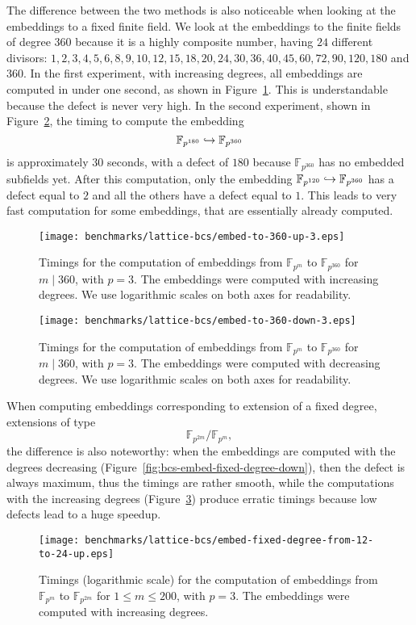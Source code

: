 The difference between the two methods is also noticeable when looking at the
embeddings to a fixed finite field. We look at the embeddings to the finite
fields of degree $360$ because it is a highly composite number, having $24$
different divisors: $1, 2, 3, 4, 5, 6, 8, 9, 10, 12, 15, 18, 20, 24, 30, 36, 40,
45, 60, 72, 90, 120, 180$ and $360$. In the first experiment, with increasing
degrees, all embeddings are computed in under one second, as shown in
Figure~\ref{fig:bcs-embed-to-360-up}. This is understandable because the defect is
never very high. In the second experiment, shown in
Figure~\ref{fig:bcs-embed-to-360-down}, the timing to compute the embedding 
\[
  \mathbb{F}_{p^{180}}\hookrightarrow\mathbb{F}_{p^{360}}
\]
is approximately $30$ seconds, with a defect of $180$ because
$\mathbb{F}_{p^{360}}$ has no embedded subfields yet. After this computation,
only the embedding $\mathbb{F}_{p^{120}}\hookrightarrow\mathbb{F}_{p^{360}}$ has a defect
equal to $2$ and all the others have a defect equal to $1$. This leads to very
fast computation for some embeddings, that are essentially already computed.
\begin{figure}
  \centering
  \texttt{[image: benchmarks/lattice-bcs/embed-to-360-up-3.eps]}
  \caption{Timings for the computation of embeddings from $\mathbb{F}_{p^{m}}$
  to $\mathbb{F}_{p^{360}}$ for $m\mid 360$, with $p=3$. The
  embeddings were computed with increasing degrees. We use logarithmic scales on
  both axes for readability.}
  \label{fig:bcs-embed-to-360-up}
\end{figure}
\begin{figure}
  \centering
  \texttt{[image: benchmarks/lattice-bcs/embed-to-360-down-3.eps]}
  \caption{Timings for the computation of embeddings from $\mathbb{F}_{p^{m}}$
  to $\mathbb{F}_{p^{360}}$ for $m\mid 360$, with $p=3$. The
  embeddings were computed with decreasing degrees. We use logarithmic scales on
  both axes for readability.}
  \label{fig:bcs-embed-to-360-down}
\end{figure}
When computing embeddings corresponding to extension of a fixed degree, \eg
extensions of type
\[
  \mathbb{F}_{p^{2m}}/\mathbb{F}_{p^{m}},
\]
the difference is also noteworthy: when the embeddings are computed with the
degrees decreasing (Figure~\ref{fig:bcs-embed-fixed-degree-down}), then the defect is
always maximum, thus the timings are rather smooth, while the computations with
the increasing degrees (Figure~\ref{fig:bcs-embed-fixed-degree-up}) produce
erratic timings because low defects lead to a huge speedup.
\begin{figure}
  \centering
  \texttt{[image: benchmarks/lattice-bcs/embed-fixed-degree-from-12-to-24-up.eps]}
  \caption{Timings (logarithmic scale) for the computation of embeddings from $\mathbb{F}_{p^{m}}$
  to $\mathbb{F}_{p^{2m}}$ for $1\leq m\leq 200$, with $p=3$. The
  embeddings were computed with increasing degrees.}
  \label{fig:bcs-embed-fixed-degree-up}
\end{figure}
